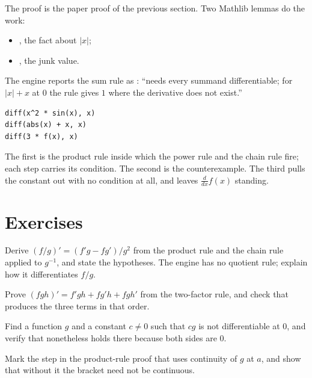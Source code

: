 The proof is the paper proof of the previous section. Two Mathlib lemmas do the work:
\begin{itemize}[nosep]
  \item {}, the fact about $|x|$;
  \item {}, the junk value.
\end{itemize}
The engine reports the sum rule as : ``needs every summand differentiable;
for $|x| + x$ at $0$ the rule gives $1$ where the derivative does not exist.''

\begin{trybox}
\begin{verbatim}
diff(x^2 * sin(x), x)
diff(abs(x) + x, x)
diff(3 * f(x), x)
\end{verbatim}
  The first is the product rule inside which the power rule and the chain rule fire; each step
  carries its condition. The second is the counterexample. The third pulls the constant out
  with no condition at all, and leaves $\frac{d}{dx} f(x)$ standing.
\end{trybox}

\section{Exercises}

\begin{exercisebox}
  Derive $(f/g)' = (f'g - fg')/g^2$ from the product rule and the chain rule applied to
  $g^{-1}$, and state the hypotheses. The engine has no quotient rule; explain how it
  differentiates $f/g$.
\end{exercisebox}

\begin{exercisebox}
  Prove $(fgh)' = f'gh + fg'h + fgh'$ from the two-factor rule, and check that 
  produces the three terms in that order.
\end{exercisebox}

\begin{exercisebox}
  Find a function $g$ and a constant $c \neq 0$ such that $cg$ is not differentiable at $0$,
  and verify that  nonetheless holds there because both sides are
  $0$.
\end{exercisebox}

\begin{exercisebox}
  Mark the step in the product-rule proof that uses continuity of $g$ at $a$, and show that
  without it the bracket need not be continuous.
\end{exercisebox}
